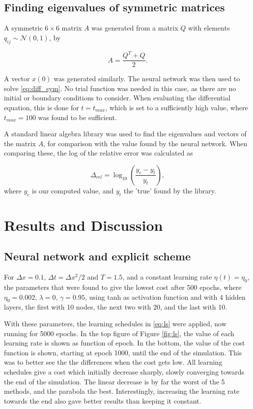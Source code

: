 \documentclass[multicolumn, 9pt]{extarticle}
\begin{document}
\subsection{Finding eigenvalues of symmetric matrices}
A symmetric $6\times6$ matrix $A$ was generated from a matrix $Q$ with elements $q_{ij} \sim \mathcal{N}(0,1)$, by

\begin{equation}\label{eq:symmat}
	A=\frac{Q^T+Q}{2}.
\end{equation}

A vector $x(0)$ was generated similarly. The neural network was then used to solve \eqref{eq:diff_sym}. No trial function was needed in this case, as there are no initial or boundary conditions to consider. When evaluating the differential equation, this is done for $t=t_{max}$, which is set to a sufficiently high value, where $t_{max}=100$ was found to be sufficient.

A standard linear algebra library was used to find the eigenvalues and vectors of the matrix $A$, for comparison with the value found by the neural network. When comparing these, the log of the relative error was calculated as

\begin{equation}\label{eq_rel_err}
	\Delta_{rel} = \log_{10}\left(\frac{y_c - y_t}{y_t}\right),
\end{equation}
where $y_c$ is our computed value, and $y_t$ the 'true' found by the library.

\section{Results and Discussion}

\subsection{Neural network and explicit scheme}
For $\Delta x=0.1$, $\Delta t=\Delta x^2/2$ and $T=1.5$, and a constant learning rate $\eta(t)=\eta_0$, the parameters that were found to give the lowest cost after 500 epochs, where $\eta_0=0.002$, $\lambda=0$, $\gamma=0.95$, using tanh as activation function and with 4 hidden layers, the first with 10 nodes, the next two with 20, and the last with 10.

With these parameters, the learning schedules in \eqref{eq:ls} were applied, now running for 5000 epochs. In the top figure of Figure \ref{fig:ls}, the value of each learning rate is shown as function of epoch. In the bottom, the value of the cost function is shown, starting at epoch 1000, until the end of the simulation. This was to better see the the differences when the cost gets low. All learning schedules give a cost which initially decrease sharply, slowly converging towards the end of the simulation. The linear decrease is by far the worst of the 5 methods, and the parabola the best. Interestingly, increasing the learning rate towards the end also gave better results than keeping it constant. 
\end{document}
